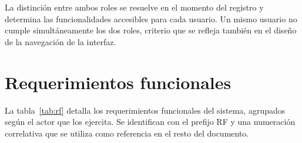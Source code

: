La distinción entre ambos roles se resuelve en el momento del registro y determina las funcionalidades accesibles para cada usuario. Un mismo usuario no cumple simultáneamente los dos roles, criterio que se refleja también en el diseño de la navegación de la interfaz.

\section{Requerimientos funcionales}\label{sec:rf}

La tabla~\ref{tab:rf} detalla los requerimientos funcionales del sistema, agrupados según el actor que los ejercita. Se identifican con el prefijo RF y una numeración correlativa que se utiliza como referencia en el resto del documento.

\setlength{\tabcolsep}{4pt}
